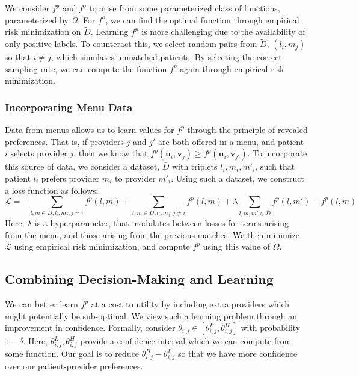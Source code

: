 We consider $f^{p}$ and $f^{o}$ to arise from some parameterized class of functions, parameterized by $\Omega$.
For $f^{o}$, we can find the optimal function through empirical risk minimization on $\tilde{D}$. 
Learning $f^{p}$ is more challenging due to the availability of only positive labels. 
To counteract this, we select random pairs from $\tilde{D}$, $(l_{i},m_{j})$ so that $i \neq j$, which simulates unmatched patients. 
By selecting the correct sampling rate, we can compute the function $f^{p}$ again through empirical risk minimization. 

\subsubsection{Incorporating Menu Data}
Data from menus allows us to learn values for $f^{p}$ through the principle of revealed preferences. 
That is, if providers $j$ and $j'$ are both offered in a menu, and patient $i$ selects provider $j$, then we know that $f^{p}(\mathbf{u}_{i},\mathbf{v}_{j}) \geq f^{p}(\mathbf{u}_{i},\mathbf{v}_{j'})$. 
To incorporate this source of data, we consider a dataset, $\bar{D}$ with triplets $l_{i},m_{i},m'_{i}$, such that patient $l_{i}$ prefers provider $m_{i}$ to provider $m'_{i}$. 
Using such a dataset, we construct a loss function as follows: 
\begin{equation}
    \mathcal{L} = -\sum_{l,m \in D, l_{i}, m_{j}, j = i} f^{p}(l,m) + \sum_{l,m \in D, l_{i}, m_{j}, j \neq i} f^{p}(l,m) + \lambda \sum_{l,m,m' \in \bar{D}} f^{p}(l,m') - f^{p}(l,m)
\end{equation}
Here, $\lambda$ is a hyperparameter, that modulates between losses for terms arising from the menu, and those arising from the previous matches. 
We then minimize $\mathcal{L}$ using empirical risk minimization, and compute $f^{p}$ using this value of $\Omega$. 

\subsection{Combining Decision-Making and Learning}
We can better learn $f^{p}$ at a cost to utility by including extra providers which might potentially be sub-optimal. 
We view such a learning problem through an improvement in confidence. 
Formally, consider $\theta_{i,j} \in [\theta_{i,j}^{L},\theta_{i,j}^{H}]$ with probability $1-\delta$. 
Here, $\theta_{i,j}^{L},\theta_{i,j}^{H}$ provide a confidence interval which we can compute from some function. 
Our goal is to reduce $\theta_{i,j}^{H}-\theta_{i,j}^{L}$ so that we have more confidence over our patient-provider preferences. 

